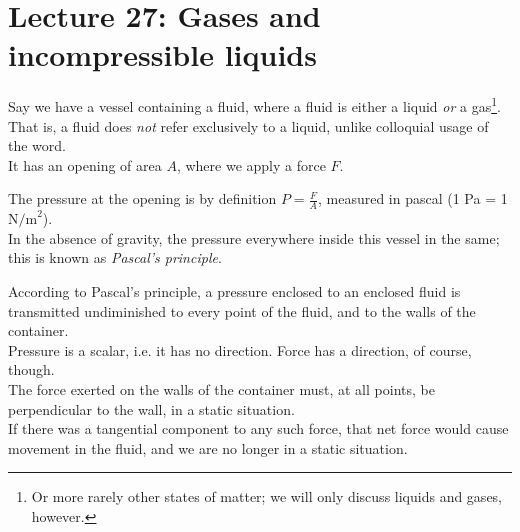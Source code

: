 \section{Lecture 27: Gases and incompressible liquids}

Say we have a vessel containing a fluid, where a fluid is either a liquid \emph{or} a gas\footnote{Or more rarely other states of matter; we will only discuss liquids and gases, however.}. That is, a fluid does \emph{not} refer exclusively to a liquid, unlike colloquial usage of the word.\\
It has an opening of area $A$, where we apply a force $F$.

\begin{figure}[H]
  \centering
{}
\end{figure}


The pressure at the opening is by definition $\displaystyle P = \frac{F}{A}$, measured in pascal (1 Pa = 1 $\text{N/m}^2$).\\
In the absence of gravity, the pressure everywhere inside this vessel in the same; this is known as \emph{Pascal's principle}.

According to Pascal's principle, a pressure enclosed to an enclosed fluid is transmitted undiminished to every point of the fluid, and to the walls of the container.\\
Pressure is a scalar, i.e. it has no direction. Force has a direction, of course, though.\\
The force exerted on the walls of the container must, at all points, be perpendicular to the wall, in a static situation.\\
If there was a tangential component to any such force, that net force would cause movement in the fluid, and we are no longer in a static situation.

